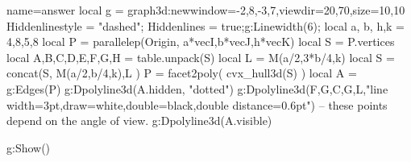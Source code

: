 \documentclass[border=5pt]{standalone}%
\begin{document}
 \begin{luadraw}{name=answer}
local g = graph3d:new{window={-2,8,-3,7},viewdir={20,70},size={10,10}}
Hiddenlinestyle = "dashed"; Hiddenlines = true;g:Linewidth(6);
local a, b, h,k = 4,8,5,8
local P = parallelep(Origin, a*vecI,b*vecJ,h*vecK)
local S = P.vertices
local A,B,C,D,E,F,G,H = table.unpack(S)
local L = M(a/2,3*b/4,k)
local S = concat(S, {M(a/2,b/4,k),L} )
P = facet2poly( cvx_hull3d(S) )
local A = g:Edges(P)
g:Dpolyline3d(A.hidden, "dotted")
g:Dpolyline3d({{F,G},{C,G,L}},"line width=3pt,draw=white,double=black,double distance=0.6pt") -- these points depend on the angle of view.
g:Dpolyline3d(A.visible)

g:Show()
\end{luadraw}
\end{document}
